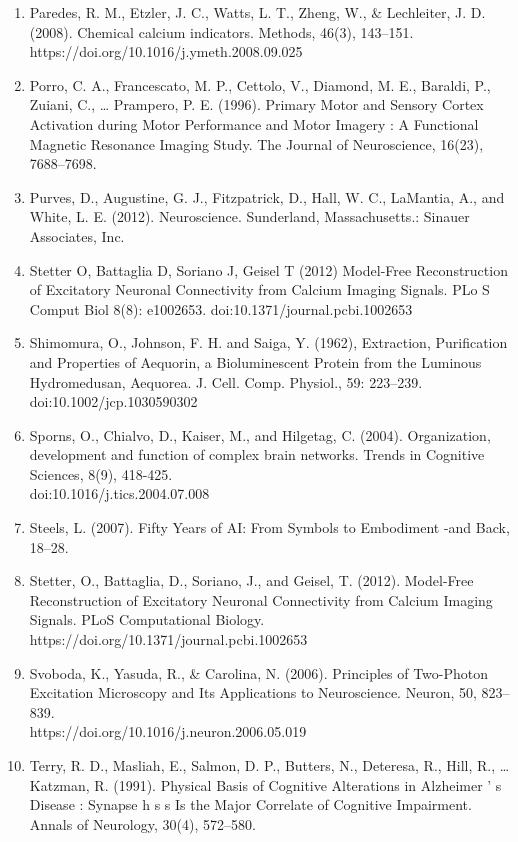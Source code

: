 \documentclass[11pt]{article}
\begin{document}
\begin{enumerate}
\item Paredes, R. M., Etzler, J. C., Watts, L. T., Zheng, W., \& Lechleiter, J. D. (2008). Chemical calcium indicators. Methods, 46(3), 143–151. https://doi.org/10.1016/j.ymeth.2008.09.025
\item Porro, C. A., Francescato, M. P., Cettolo, V., Diamond, M. E., Baraldi, P., Zuiani, C., … Prampero, P. E. (1996). Primary Motor and Sensory Cortex Activation during Motor Performance and Motor Imagery : A Functional Magnetic Resonance Imaging Study. The Journal of Neuroscience, 16(23), 7688–7698.
\item Purves, D., Augustine, G. J., Fitzpatrick, D., Hall, W. C., LaMantia, A., and White, L. E. (2012). Neuroscience. Sunderland, Massachusetts.: Sinauer Associates, Inc.
\item Stetter  O,  Battaglia  D,  Soriano  J,  Geisel  T  (2012)  Model-Free  Reconstruction  of  Excitatory  Neuronal  Connectivity  from  Calcium  Imaging  Signals.  PLo S Comput  Biol  8(8):  e1002653.  doi:10.1371/journal.pcbi.1002653
\item Shimomura, O., Johnson, F. H. and Saiga, Y. (1962), Extraction, Purification and Properties of Aequorin, a Bioluminescent Protein from the Luminous Hydromedusan, Aequorea. J. Cell. Comp. Physiol., 59: 223–239. doi:10.1002/jcp.1030590302
\item Sporns, O., Chialvo, D., Kaiser, M., and Hilgetag, C. (2004). Organization, development and function of complex brain networks. Trends in Cognitive Sciences, 8(9), 418-425. \\doi:10.1016/j.tics.2004.07.008
\item Steels, L. (2007). Fifty Years of AI: From Symbols to Embodiment -and Back, 18–28.
\item Stetter, O., Battaglia, D., Soriano, J., and Geisel, T. (2012). Model-Free Reconstruction of Excitatory Neuronal Connectivity from Calcium Imaging Signals. PLoS Computational Biology. https://doi.org/10.1371/journal.pcbi.1002653
\item Svoboda, K., Yasuda, R., \& Carolina, N. (2006). Principles of Two-Photon Excitation Microscopy and Its Applications to Neuroscience. Neuron, 50, 823–839.\\https://doi.org/10.1016/j.neuron.2006.05.019
\item Terry, R. D., Masliah, E., Salmon, D. P., Butters, N., Deteresa, R., Hill, R., … Katzman, R. (1991). Physical Basis of Cognitive Alterations in Alzheimer ’ s Disease : Synapse h s s Is the Major Correlate of Cognitive Impairment. Annals of Neurology, 30(4), 572–580.

\end{enumerate}
\end{document}
